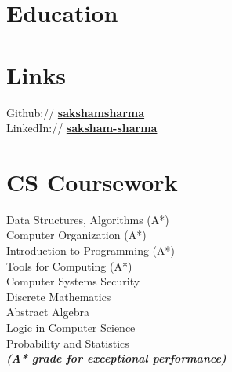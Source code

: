 \documentclass[a4paper]{deedy-resume} %
\begin{document}

\begin{minipage}[t]{0.33\textwidth} %

  \section{Education} 



  \sectionspace
  \sectionspace
  \sectionspace


  \sectionspace

  \section{Links} 

  Github:// \href{https://github.com/sakshamsharma}{\bf sakshamsharma} \\
  LinkedIn:// \href{https://www.linkedin.com/in/sakshamsharma}{\bf saksham-sharma} \\

  \sectionspace

  \section{CS Coursework}
  Data Structures, Algorithms (A*)\\
  Computer Organization (A*)\\
  Introduction to Programming (A*)\\
  Tools for Computing (A*)\\
  Computer Systems Security\\
  Discrete Mathematics\\
  Abstract Algebra\\
  Logic in Computer Science\\
  Probability and Statistics\\

  {\footnotesize \textit{\textbf{(A* grade for exceptional performance) }}} \\


\end{minipage}
\end{document}
